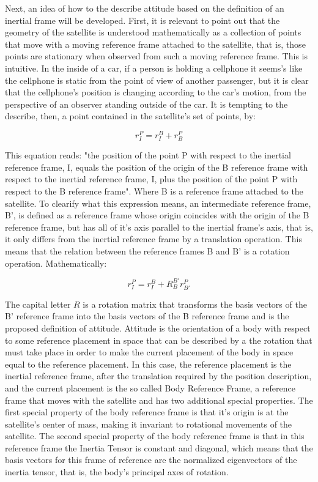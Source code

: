 \indent
	Next, an idea of how to the describe attitude based on the definition of an inertial frame will be developed. First, it is relevant to point out that the geometry of the satellite is understood mathematically as a collection of points that move with a moving reference frame attached to the satellite, that is, those points are stationary when observed from such a moving reference frame. This is intuitive. In the inside of a car, if a person is holding a cellphone it seems's like the cellphone is static from the point of view of another passenger, but it is clear that the cellphone's position is changing according to the car's motion, from the perspective of an observer standing outside of the car. It is tempting to the describe, then, a point contained in the satellite's set of points, by:

\begin{equation}
	r^P_I = r^{B}_I + r^P_{B}
\end{equation}

\indent
	This equation reads: "the position of the point P with respect to the inertial reference frame, I, equals the position of the origin of the B reference frame with respect to the inertial reference frame, I, plus the position of the point P with respect to the B reference frame". Where B is a reference frame attached to the satellite. To clearify what this expression means, an intermediate reference frame, B', is defined as a reference frame whose origin coincides with the origin of the B reference frame, but has all of it's axis parallel to the inertial frame's axis, that is, it only differs from the inertial reference frame by a translation operation. This means that the relation between the reference frames B and B' is a rotation operation. Mathematically: 

\begin{equation}
	r^P_I = r^{B}_I + R ^{B'}_{B} r^P_{B'}
\end{equation}

\indent
	The capital letter $R$ is a rotation matrix that transforms the basis vectors of the B' reference frame into the basis vectors of the B reference frame and is the proposed definition of attitude. Attitude is the orientation of a body with respect to some reference placement in space that can be described by a the rotation that must take place in order to make the current placement of the body in space equal to the reference placement. In this case, the reference placement is the inertial reference frame, after the translation required by the position description, and the current placement is the so called Body Reference Frame, a reference frame that moves with the satellite and has two additional special properties. The first special property of the body reference frame is that it's origin is at the satellite's center of mass, making it invariant to rotational movements of the satellite. The second special property of the body reference frame is that in this reference frame the Inertia Tensor is constant and diagonal, which means that the basis vectors for this frame of reference are the normalized eigenvectors of the inertia tensor, that is, the body's principal axes of rotation.

